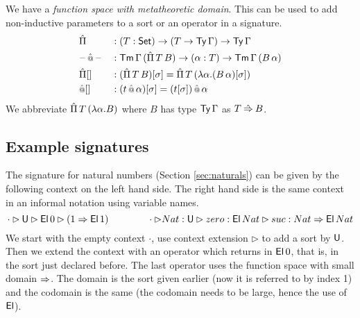 \documentclass[acmsmall,review,anonymous]{acmart}\settopmatter{printfolios=true,printccs=false,printacmref=false}
\begin{document}
We have a \emph{function space with metatheoretic domain}. This can be
used to add non-inductive parameters to a sort or an operator in a
signature.
\begin{alignat*}{5}
  & \hat{\Pi} && : (T:\mathsf{Set})\rightarrow(T\rightarrow\mathsf{Ty}\,\Gamma)\rightarrow\mathsf{Ty}\,\Gamma \\
  & \mathord{\hspace{1pt}\text{--}\hspace{1pt}}\mathop{\hat{\mathop{{\scriptstyle @}}}} \mathord{\hspace{1pt}\text{--}\hspace{1pt}} && : \mathsf{Tm}\,\Gamma\,(\hat{\Pi}\,T\,B)\rightarrow(\alpha:T) \rightarrow\mathsf{Tm}\,\Gamma\,(B\,\alpha) \\
  & {\hat{\Pi}[]} && : (\hat{\Pi}\,T\,B)[\sigma] = \hat{\Pi}\,T\,(\lambda \alpha.(B\,\alpha)[\sigma]) \\
  & {\mathop{\hat{\mathop{{\scriptstyle @}}}}[]} && : (t\mathop{\hat{\mathop{{\scriptstyle @}}}}\alpha)[\sigma] = (t[\sigma])\mathop{\mathop{\hat{\mathop{{\scriptstyle @}}}}}\alpha
\end{alignat*}
We abbreviate $\hat{\Pi}\,T\,(\lambda\alpha.B)$ where $B$ has type
$\mathsf{Ty}\,\Gamma$ as $T\mathbin{\hat{\Rightarrow}} B$.

\subsection{Example signatures}

The signature for natural numbers (Section \ref{sec:naturals}) can be
given by the following context on the left hand side. The right hand
side is the same context in an informal notation using variable names.
\[
\cdot\rhd\mathsf{U}\rhd\mathsf{El}\,0\rhd (1\Rightarrow \mathsf{El}\,1) \hspace{4em} \cdot\rhd Nat:\mathsf{U}\rhd zero:\mathsf{El}\,Nat\rhd suc:Nat\Rightarrow\mathsf{El}\,Nat
\]
We start with the empty context $\cdot$, use context extension $\rhd$
to add a sort by $\mathsf{U}$. Then we extend the context with an operator
which returns in $\mathsf{El}\,0$, that is, in the sort just declared
before. The last operator uses the function space with small domain
$\Rightarrow$. The domain is the sort given earlier (now it is referred to by
index 1) and the codomain is the same (the codomain needs to be large,
hence the use of $\mathsf{El}$).
\end{document}
